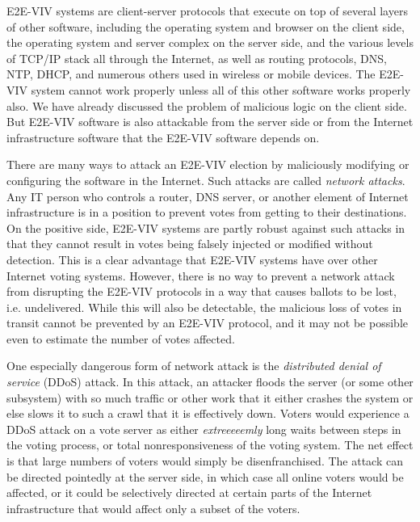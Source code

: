 E2E-VIV systems are client-server protocols that execute on top of
several layers of other software, including the operating system and
browser on the client side, the operating system and server complex on
the server side, and the various levels of TCP/IP stack all through
the Internet, as well as routing protocols, DNS, NTP, DHCP, and
numerous others used in wireless or mobile devices. The E2E-VIV system
cannot work properly unless all of this other software works properly
also. We have already discussed the problem of malicious logic on the
client side. But E2E-VIV software is also attackable from the server
side or from the Internet infrastructure software that the E2E-VIV
software depends on.

There are many ways to attack an E2E-VIV election by maliciously
modifying or configuring the software in the Internet. Such attacks
are called \emph{network attacks}. Any IT person who controls a
router, DNS server, or another element of Internet infrastructure is
in a position to prevent votes from getting to their destinations.  On
the positive side, E2E-VIV systems are partly robust against such
attacks in that they cannot result in votes being falsely injected or
modified without detection. This is a clear advantage that E2E-VIV
systems have over other Internet voting systems. However, there is no
way to prevent a network attack from disrupting the E2E-VIV protocols
in a way that causes ballots to be lost, i.e. undelivered.  While this
will also be detectable, the malicious loss of votes in transit cannot
be prevented by an E2E-VIV protocol, and it may not be possible even
to estimate the number of votes affected.

One especially dangerous form of network attack is the
\emph{distributed denial of service} (DDoS) attack.  In this attack,
an attacker floods the server (or some other subsystem) with so much
traffic or other work that it either crashes the system or else slows
it to such a crawl that it is effectively down. Voters would
experience a DDoS attack on a vote server as either
\emph{extreeeeemly} long waits between steps in the voting process, or
total nonresponsiveness of the voting system. The net effect is that
large numbers of voters would simply be disenfranchised. The attack
can be directed pointedly at the server side, in which case all online
voters would be affected, or it could be selectively directed at
certain parts of the Internet infrastructure that would affect only a
subset of the voters.

